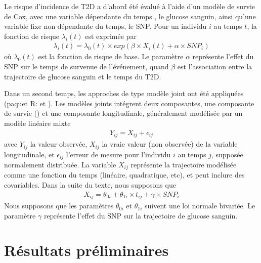\documentclass[11pt, a4paper]{article}
\begin{document}
\par{Le risque d’incidence de T2D a d’abord été évalué à l’aide d’un modèle de survie de Cox,
avec une variable dépendante du temps \citep{fisher_time-dependent_1999}, le glucose sanguin,
ainsi qu’une variable fixe non dépendante du temps, le SNP.
Pour un individu $i$ au temps $t$, la fonction de risque $\lambda_i(t)$ est exprimée par
\begin{eqnarray}\lambda_i(t)=\lambda_0(t)\times exp(\beta \times X_i(t)+\alpha \times SNP_i)\label{eq:1}\end{eqnarray}
où $\lambda_0(t)$ est la fonction de risque de base.
Le paramètre $\alpha$ représente l’effet du SNP sur le temps de survenue de l’événement,
quand $\beta$ est l’association entre la trajectoire de glucose sanguin et le temps du T2D.}
\par{Dans un second temps, les approches de type modèle joint ont été appliquées (paquet R:  et ).
Les modèles joints intégrent deux composantes, une composante de survie () et
une composante longitudinale, généralement modélisée par un modèle linéaire mixte
\begin{eqnarray}Y_{ij}=X_{ij}+\epsilon_{ij}\label{eq:2}\end{eqnarray}
avec $Y_{ij}$ la valeur observée, $X_{ij}$ la vraie valeur (non observée) de la variable longitudinale, et
$\epsilon_{ij}$ l’erreur de mesure pour l’individu $i$ au temps $j$, supposée normalement distribuée.
La variable $X_{ij}$ représente la trajectoire modélisée comme une fonction du temps (linéaire, quadratique, etc),
et peut inclure des covariables. Dans la suite du texte, nous supposons que
\begin{eqnarray}X_{ij}=\theta_{0i}+\theta_{1i}\times t_{ij}+\gamma \times SNP_i\label{eq:3}\end{eqnarray}
Nous supposons que les paramètres $\theta_{0i}$ et $\theta_{1i}$ suivent une loi normale bivariée.
Le paramètre $\gamma$ représente l’effet du SNP sur la trajectoire de glucose sanguin.}


\section{Résultats préliminaires}
\end{document}
